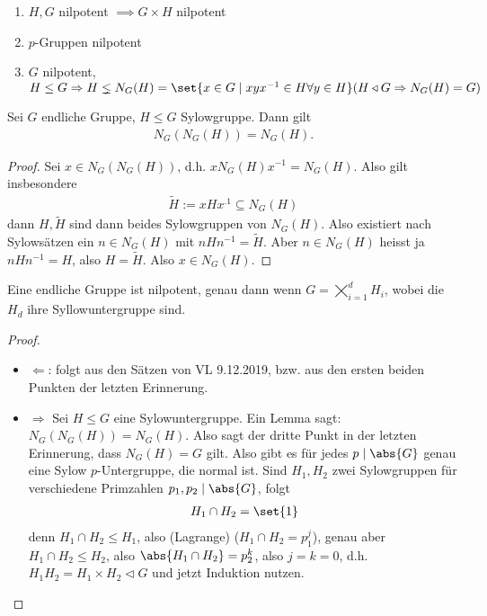 \begin{erinnerung}
	\begin{enumerate}
		\item $H,G$ nilpotent $\implies G \times H$ nilpotent
		\item $p$-Gruppen nilpotent
		\item $G$ nilpotent, $H \le G \implies H \lneq N_G(H) = \set{x \in G \mid xyx^{-1}\in H \forall y \in H} (H \lhd G \implies N_G(H) = G)$
	\end{enumerate}
\end{erinnerung}
\begin{lemma}
	Sei $G$ endliche Gruppe, $H \le G$ Sylowgruppe. Dann gilt
	\begin{align*}
		N_G(N_G(H)) = N_G(H).
	\end{align*}
\end{lemma}
\begin{proof}
	Sei $x \in N_G(N_G(H))$, d.h. $xN_G(H)x^{-1} = N_G(H)$. Also gilt insbesondere
	\begin{align*}
		\tilde{H} := xHx^{.1} \subseteq N_G(H)
	\end{align*}
	dann $H, \tilde{H}$ sind dann beides Sylowgruppen von $N_G(H)$. Also existiert nach Sylowsätzen ein $n \in N_G(H)$ mit $nHn^{-1} = \tilde{H}$. Aber $n \in N_G(H)$ heisst ja $nHn^{-1} = H$, also $H = \tilde{H}$. Also $x \in N_G(H)$.
\end{proof}
\begin{proposition}
	Eine endliche Gruppe ist nilpotent, genau dann wenn $G = \bigtimes_{i=1}^d H_i$, wobei die $H_d$ ihre Syllowuntergruppe sind.
\end{proposition}
\begin{proof}
	\begin{itemize}
		\item $\Leftarrow$: folgt aus den Sätzen von VL 9.12.2019, bzw. aus den ersten beiden Punkten der letzten Erinnerung. %
		\item $\Rightarrow$ Sei $H \le G$ eine Sylowuntergruppe. Ein Lemma sagt: $N_G(N_G(H)) = N_G(H)$. Also sagt der dritte Punkt in der letzten Erinnerung, dass $N_G(H) = G$ gilt. Also gibt es für jedes $p \mid \abs{G}$ genau eine Sylow $p$-Untergruppe, die normal ist. Sind $H_1,H_2$ zwei Sylowgruppen für verschiedene Primzahlen $p_1,p_2 \mid \abs{G}$, folgt
		\begin{align*}
			H_1 \cap H_2 = \set{1}
		\end{align*}
		denn $H_1 \cap H_2 \le H_1$, also (Lagrange) ($H_1 \cap H_2 = p^j_1$), genau aber $H_1 \cap H_2 \le H_2$, also $\abs{H_1 \cap H_2} = p_2^k$, also $j = k = 0$, d.h. $H_1H_2 = H_1 \times H_2 \lhd G$ und jetzt Induktion nutzen.
	\end{itemize}
\end{proof}
